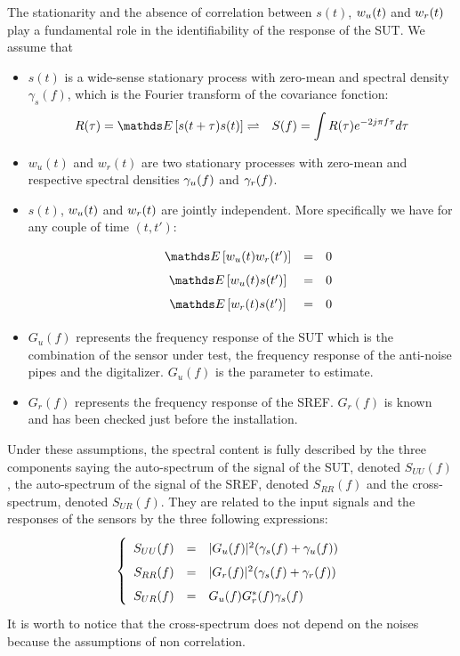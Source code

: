 The stationarity and the absence of correlation between $s(t)$, $w_{{u}}(t)$ and $w_{{r}}(t)$ play a fundamental  role in the identifiability of the response of the SUT. We assume that
\begin{itemize}
\item
$s(t)$ is a wide-sense stationary process with zero-mean and spectral density $\gamma_{s}(f)$,
which is the Fourier transform of the covariance fonction:
\begin{eqnarray*}
 R(\tau) = \esp{s(t+\tau)s(t)}&\rightleftharpoons  &
 S(f)=\int R(\tau) e^{-2j\pi f\tau}d\tau
\end{eqnarray*}
\item
$w_{u}(t)$ and $w_{r}(t)$ are two  stationary processes with zero-mean and respective spectral densities $\gamma_{{u}}(f)$ and $\gamma_{{r}}(f)$. 
\item
$s(t)$,  $w_{{u}}(t)$ and $w_{{r}}(t)$ are jointly independent. More specifically we have for any couple of time $(t,t')$:
\begin{eqnarray*}
\begin{array}{lccr}
 &\esp{w_{\ut}(t)w_{r}(t')}&=&0
 \\
& \esp{w_{\ut}(t)s(t')}&=&0
 \\
& \esp{w_{\rf}(t)s(t')}&=&0
\end{array}
 \end{eqnarray*}
\item
$G_{u}(f)$ represents the frequency response of the SUT which is the combination of the sensor under test, the frequency response of the anti-noise pipes and the digitalizer. $G_{u}(f)$ is the parameter to estimate.
\item
$G_{r}(f)$ represents the frequency response of the SREF. $G_{r}(f)$ is known and has been checked just before the installation.
\end{itemize}

Under these assumptions, the spectral content is fully described by the three components saying the  auto-spectrum of the signal of the SUT, denoted $S_{UU}(f)$, the auto-spectrum of the signal of the SREF, denoted  $S_{RR}(f)$ and the  cross-spectrum, denoted $S_{UR}(f)$. They are related to the input signals and the responses of the sensors by the three following expressions:
\begin{eqnarray}
\label{eq:spectral-model}
\left\{
\renewcommand\arraystretch{1.6}
\begin{array}{rcl}
S_{UU}(f)&=&|G_{\ut}(f)|^{2} (\gamma_{s}(f)+\gamma_{\ut}(f))
\\
S_{RR}(f)&=&|G_{\rf}(f)|^{2} (\gamma_{s}(f)+\gamma_{\rf}(f))
\\
S_{UR}(f)&=&G_{\ut}(f)G^{*}_{\rf}(f)\gamma_{s}(f)
\end{array}
\right.
\end{eqnarray}
It is worth to notice that the cross-spectrum does not depend on the noises because the assumptions of non correlation.


